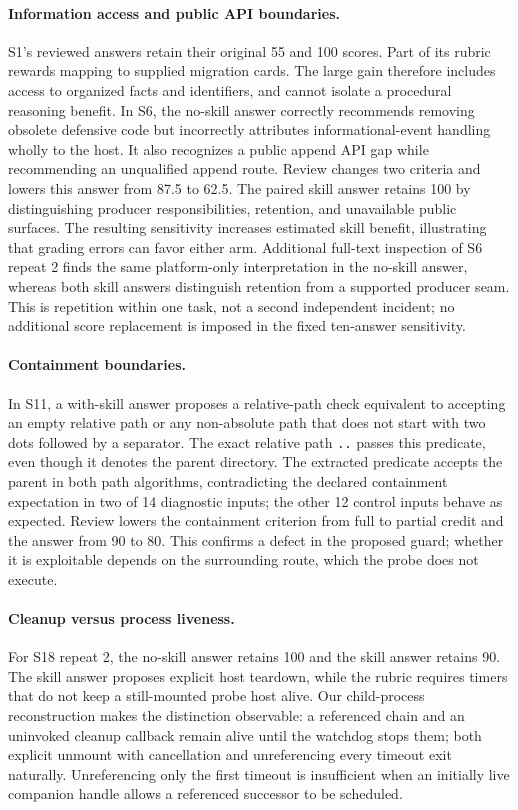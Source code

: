 \documentclass[11pt]{article}
\begin{document}
\paragraph{Information access and public API boundaries.}
S1's reviewed answers retain their original 55 and 100 scores. Part of its rubric rewards mapping to supplied migration cards. The large gain therefore includes access to organized facts and identifiers, and cannot isolate a procedural reasoning benefit. In S6, the no-skill answer correctly recommends removing obsolete defensive code but incorrectly attributes informational-event handling wholly to the host. It also recognizes a public append API gap while recommending an unqualified append route. Review changes two criteria and lowers this answer from 87.5 to 62.5. The paired skill answer retains 100 by distinguishing producer responsibilities, retention, and unavailable public surfaces. The resulting sensitivity increases estimated skill benefit, illustrating that grading errors can favor either arm. Additional full-text inspection of S6 repeat 2 finds the same platform-only interpretation in the no-skill answer, whereas both skill answers distinguish retention from a supported producer seam. This is repetition within one task, not a second independent incident; no additional score replacement is imposed in the fixed ten-answer sensitivity.

\paragraph{Containment boundaries.}
In S11, a with-skill answer proposes a relative-path check equivalent to accepting an empty relative path or any non-absolute path that does not start with two dots followed by a separator. The exact relative path \texttt{..} passes this predicate, even though it denotes the parent directory. The extracted predicate accepts the parent in both path algorithms, contradicting the declared containment expectation in two of 14 diagnostic inputs; the other 12 control inputs behave as expected. Review lowers the containment criterion from full to partial credit and the answer from 90 to 80. This confirms a defect in the proposed guard; whether it is exploitable depends on the surrounding route, which the probe does not execute.

\paragraph{Cleanup versus process liveness.}
For S18 repeat 2, the no-skill answer retains 100 and the skill answer retains 90. The skill answer proposes explicit host teardown, while the rubric requires timers that do not keep a still-mounted probe host alive. Our child-process reconstruction makes the distinction observable: a referenced chain and an uninvoked cleanup callback remain alive until the watchdog stops them; both explicit unmount with cancellation and unreferencing every timeout exit naturally. Unreferencing only the first timeout is insufficient when an initially live companion handle allows a referenced successor to be scheduled.
\end{document}
